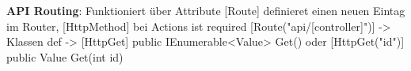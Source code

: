 \documentclass[10pt,landscape]{article}
\begin{document}
\begin{multicols}{3}
        \textbf{API Routing}: Funktioniert über Attribute [Route] definieret einen neuen Eintag im Router, [HttpMethod] bei Actions ist required
        [Route("api/[controller]")] -> Klassen def -> [HttpGet] public IEnumerable<Value> Get()  oder [HttpGet("{id}")] public Value Get(int id)


        
      
    \end{multicols}
\end{document}
